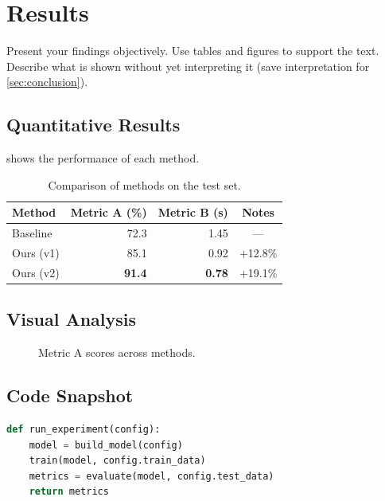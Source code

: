 \section{Results}
\label{sec:results}

Present your findings objectively. Use tables and figures to support the text.
Describe what is shown without yet interpreting it (save interpretation for
\cref{sec:conclusion}).

\subsection{Quantitative Results}

 shows the performance of each method.

\begin{table}[h]
  \centering
  \caption{Comparison of methods on the test set.}
  \label{tab:results}
  \begin{tabular}{lrrc}
    \toprule
    Method       & Metric A (\%) & Metric B (s) & Notes   \\
    \midrule
    Baseline     & 72.3          & 1.45         & —       \\
    Ours (v1)    & 85.1          & 0.92         & +12.8\% \\
    Ours (v2)    & \textbf{91.4} & \textbf{0.78} & +19.1\% \\
    \bottomrule
  \end{tabular}
\end{table}

\subsection{Visual Analysis}

\begin{figure}[h]
  \centering
  \caption{Metric A scores across methods.}
  \label{fig:results-bar}
\end{figure}

\subsection{Code Snapshot}

\begin{lstlisting}[language=Python, caption={Core algorithm implementation.}]
def run_experiment(config):
    model = build_model(config)
    train(model, config.train_data)
    metrics = evaluate(model, config.test_data)
    return metrics
\end{lstlisting}
